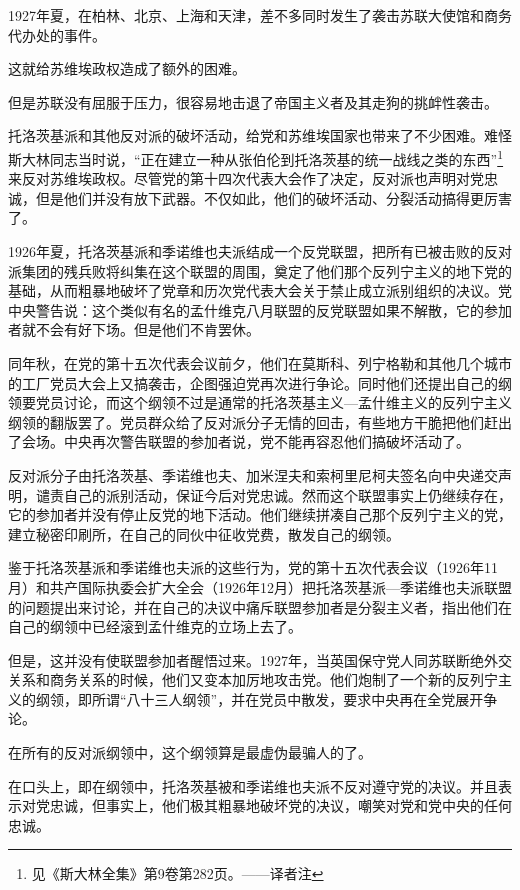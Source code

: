 1927年夏，在柏林、北京、上海和天津，差不多同时发生了袭击苏联大使馆和商务代办处的事件。

这就给苏维埃政权造成了额外的困难。

但是苏联没有屈服于压力，很容易地击退了帝国主义者及其走狗的挑衅性袭击。

托洛茨基派和其他反对派的破坏活动，给党和苏维埃国家也带来了不少困难。难怪斯大林同志当时说，“正在建立一种从张伯伦到托洛茨基的统一战线之类的东西”\footnote{见《斯大林全集》第9卷第282页。——译者注}来反对苏维埃政权。尽管党的第十四次代表大会作了决定，反对派也声明对党忠诚，但是他们并没有放下武器。不仅如此，他们的破坏活动、分裂活动搞得更厉害了。

1926年夏，托洛茨基派和季诺维也夫派结成一个反党联盟，把所有已被击败的反对派集团的残兵败将纠集在这个联盟的周围，奠定了他们那个反列宁主义的地下党的基础，从而粗暴地破坏了党章和历次党代表大会关于禁止成立派别组织的决议。党中央警告说：这个类似有名的孟什维克八月联盟的反党联盟如果不解散，它的参加者就不会有好下场。但是他们不肯罢休。

同年秋，在党的第十五次代表会议前夕，他们在莫斯科、列宁格勒和其他几个城市的工厂党员大会上又搞袭击，企图强迫党再次进行争论。同时他们还提出自己的纲领要党员讨论，而这个纲领不过是通常的托洛茨基主义—孟什维主义的反列宁主义纲领的翻版罢了。党员群众给了反对派分子无情的回击，有些地方干脆把他们赶出了会场。中央再次警告联盟的参加者说，党不能再容忍他们搞破坏活动了。

反对派分子由托洛茨基、季诺维也夫、加米涅夫和索柯里尼柯夫签名向中央递交声明，谴责自己的派别活动，保证今后对党忠诚。然而这个联盟事实上仍继续存在，它的参加者并没有停止反党的地下活动。他们继续拼凑自己那个反列宁主义的党，建立秘密印刷所，在自己的同伙中征收党费，散发自己的纲领。

鉴于托洛茨基派和季诺维也夫派的这些行为，党的第十五次代表会议（1926年11月）和共产国际执委会扩大全会（1926年12月）把托洛茨基派—季诺维也夫派联盟的问题提出来讨论，并在自己的决议中痛斥联盟参加者是分裂主义者，指出他们在自己的纲领中已经滚到孟什维克的立场上去了。

但是，这并没有使联盟参加者醒悟过来。1927年，当英国保守党人同苏联断绝外交关系和商务关系的时候，他们又变本加厉地攻击党。他们炮制了一个新的反列宁主义的纲领，即所谓“八十三人纲领”，并在党员中散发，要求中央再在全党展开争论。

在所有的反对派纲领中，这个纲领算是最虚伪最骗人的了。

在口头上，即在纲领中，托洛茨基被和季诺维也夫派不反对遵守党的决议。并且表示对党忠诚，但事实上，他们极其粗暴地破坏党的决议，嘲笑对党和党中央的任何忠诚。

